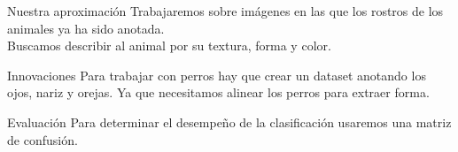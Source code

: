 \documentclass{beamer}
\begin{document}
	\begin{frame}{Nuestra aproximación}
		Trabajaremos sobre imágenes en las que los rostros de los animales ya ha sido anotada.\\
		Buscamos describir al animal por su textura, forma y color.
	\end{frame}
	\begin{frame}{Innovaciones}
		Para trabajar con perros hay que crear un dataset anotando los ojos, nariz y orejas.
		Ya que necesitamos alinear los perros para extraer forma.
	\end{frame}
	\begin{frame}{Evaluación}
		Para determinar el desempeño de la clasificación usaremos una matriz de confusión.
	\end{frame}
\end{document}
